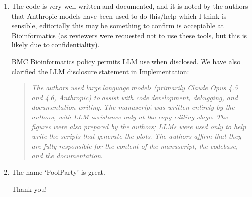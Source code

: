 \documentclass[11pt]{article}
\newenvironment{response}{\par\color{responseblue}}{\par}
\newenvironment{msquote}
  {\begin{quote}\color{responseblue}\itshape\noindent\ignorespaces}
  {\end{quote}}
\begin{document}
\begin{enumerate}
\begin{msquote}
For example, in the SpliceAI analysis of Fig.~\ref{ms-fig:figure4}, the cryptic splice-site strength and position recorded in each design card provided the covariates used for surrogate modeling.
\end{msquote}

\item The code is very well written and documented, and it is noted by the
authors that Anthropic models have been used to do this/help which I think is
sensible, editorially this may be something to confirm is acceptable at
Bioinformatics (as reviewers were requested not to use these tools, but this is
likely due to confidentiality).

\begin{response}
BMC Bioinformatics policy permits LLM use when disclosed. We have also clarified the LLM disclosure statement in Implementation:
\begin{msquote}
The authors used large language models (primarily Claude Opus 4.5 and 4.6, Anthropic) to assist with code development, debugging, and documentation writing. The manuscript was written entirely by the authors, with LLM assistance only at the copy-editing stage. The figures were also prepared by the authors; LLMs were used only to help write the scripts that generate the plots. The authors affirm that they are fully responsible for the content of the manuscript, the codebase, and the documentation. 
\end{msquote}
\end{response}

\item The name `PoolParty' is great.

\begin{response}
Thank you!
\end{response}
\end{enumerate}



\end{document}

